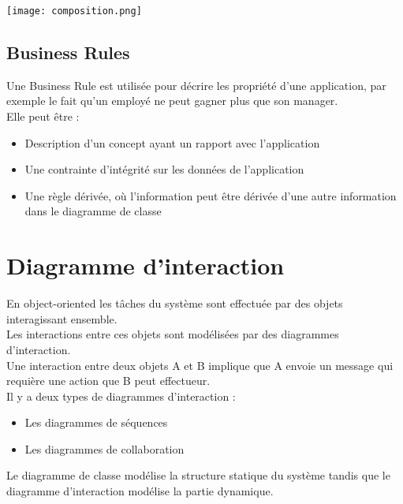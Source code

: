 \documentclass{report}
\begin{document}
			\texttt{[image: composition.png]}\\

		\subsection{Business Rules}

			Une Business Rule est utilisée pour décrire les propriété d'une application, par exemple le fait qu'un employé ne peut gagner plus que son manager.\\

			Elle peut être : \\

			\begin{itemize}
				\item Description d'un concept ayant un rapport avec l'application
				\item Une contrainte d'intégrité sur les données de l'application
				\item Une règle dérivée, où l'information peut être dérivée d'une autre information dans le diagramme de classe
			\end{itemize}


	\section{Diagramme d'interaction}

		En object-oriented les tâches du système sont effectuée par des objets interagissant ensemble.\\
		Les interactions entre ces objets sont modélisées par des diagrammes d'interaction.\\
		Une interaction entre deux objets A et B implique que A envoie un message qui requière une action que B peut effectueur.\\

		Il y a deux types de diagrammes d'interaction : \\

		\begin{itemize}
			\item Les diagrammes de séquences
			\item Les diagrammes de collaboration\\
		\end{itemize}

		Le diagramme de classe modélise la structure statique du système tandis que le diagramme d'interaction modélise la partie dynamique.\\
\end{document}
